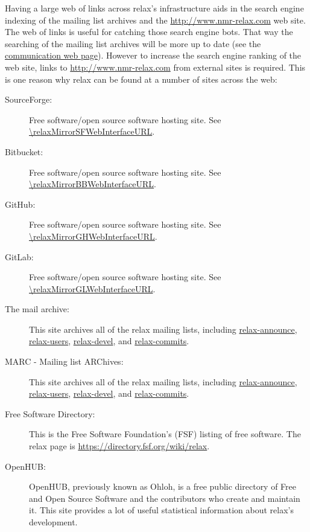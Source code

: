 Having a large web of links across relax's infrastructure aids in the search engine indexing of the mailing list archives and the \href{http://www.nmr-relax.com}{http://www.nmr-relax.com} web site.
The web of links is useful for catching those search engine bots.
That way the searching of the mailing list archives will be more up to date (see the \href{http://www.nmr-relax.com/communication.html}{communication web page}).
However to increase the search engine ranking of the web site, links to \url{http://www.nmr-relax.com} from external sites is required.
This is one reason why relax can be found at a number of sites across the web:
\begin{description}
  \item[SourceForge:]  Free software/open source software hosting site.
    See \url{\relaxMirrorSFWebInterfaceURL}.
  \item[Bitbucket:]  Free software/open source software hosting site.
    See \url{\relaxMirrorBBWebInterfaceURL}.
  \item[GitHub:]  Free software/open source software hosting site.
    See \url{\relaxMirrorGHWebInterfaceURL}.
  \item[GitLab:]  Free software/open source software hosting site.
    See \url{\relaxMirrorGLWebInterfaceURL}.
  \item[The mail archive:]  This site archives all of the relax mailing lists, including \href{http://mail-archive.com/relax-announce@gna.org/}{relax-announce}, \href{http://mail-archive.com/relax-users@gna.org/}{relax-users}, \href{http://mail-archive.com/relax-devel@gna.org/}{relax-devel}, and \href{http://mail-archive.com/relax-commits@gna.org/}{relax-commits}.
  \item[MARC -  Mailing list ARChives:]  This site archives all of the relax mailing lists, including \href{http://marc.info/?l=relax-announce&r=1&w=2}{relax-announce}, \href{http://marc.info/?l=relax-users&r=1&w=2}{relax-users}, \href{http://marc.info/?l=relax-devel&r=1&w=2}{relax-devel}, and \href{http://marc.info/?l=relax-commits&r=1&w=2}{relax-commits}.
  \item[Free Software Directory:]  This is the Free Software Foundation's (FSF) listing of free software.
    The relax page is \url{https://directory.fsf.org/wiki/relax}.
  \item[OpenHUB:]  OpenHUB, previously known as Ohloh, is a free public directory of Free and Open Source Software and the contributors who create and maintain it.
    This site provides a lot of useful statistical information about relax's development.

\end{description}
